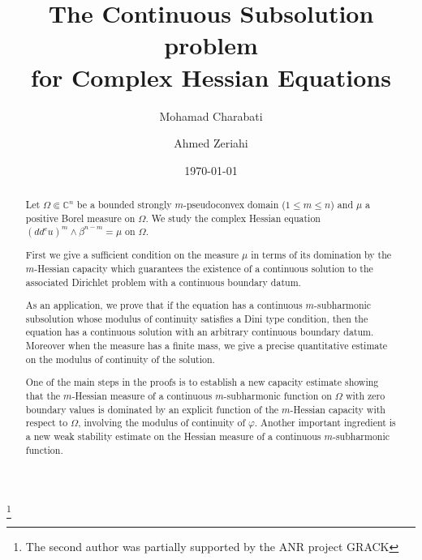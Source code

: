 \documentclass[12pt]{amsart}
\author{Mohamad Charabati}
\author{Ahmed Zeriahi}
\theoremstyle{definition}
\numberwithin{theorem}{section}
\numberwithin{equation}{section}
\newcommand{\C}{\mathbb{C}}
\begin{document}
\thanks{The second author was partially supported by the ANR project GRACK}
  




\title[The continuous subsolution problem]{ The  Continuous Subsolution problem  \\ for Complex Hessian Equations }


\date{\today}


\maketitle

\tableofcontents


\begin{abstract}
 Let  $\Omega \Subset \C^n$ be a bounded strongly $m$-pseudoconvex domain ($1\leq m\leq n$) and  $\mu$ a positive Borel measure on $\Omega$. 
  We   study the complex Hessian equation $(dd^c u)^m \wedge \beta^{n - m} = \mu$ on $\Omega$. 
 
 First we give a sufficient condition on the measure $\mu$ in terms of its domination by the $m$-Hessian capacity which guarantees the existence of a continuous solution to the associated Dirichlet problem with a continuous boundary datum.
 
  As an application, we prove that if the equation has a continuous $m$-subharmonic subsolution whose modulus of continuity satisfies a Dini type condition, then the equation has a continuous solution with an arbitrary continuous boundary datum. Moreover when the measure has a finite mass, we give a precise quantitative estimate on the modulus of continuity of the solution. 
 
 One of the main steps in the proofs is to establish a new capacity estimate showing that  the $m$-Hessian measure of a continuous $m$-subharmonic function on $\Omega$ with zero boundary values is dominated by  an explicit function of the $m$-Hessian capacity with respect to $\Omega$, involving the modulus of continuity of $\varphi$. Another important ingredient is a new weak stability estimate on the Hessian measure of a continuous $m$-subharmonic function.
\end{abstract} 
\end{document}
